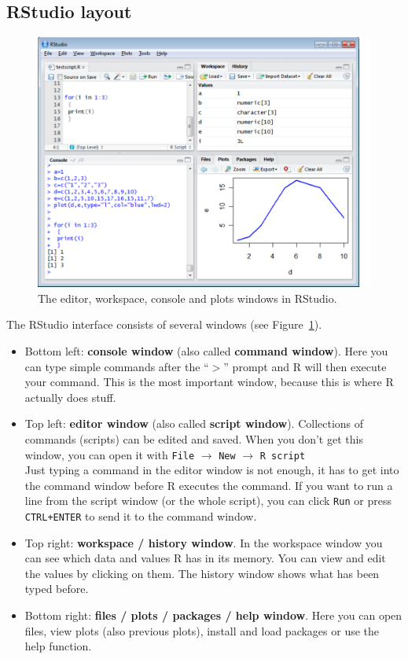 \documentclass[a4paper,11pt,twocolumn,tablecaptionabove]{scrartcl}
\begin{document}
\subsection{RStudio layout}

\begin{figure}[htb]
  \centering
  \includegraphics[width=13cm, clip=true, trim=0cm 0cm 9mm 0cm]{img/rstudio_screenshot.pdf}
  \caption{The editor, workspace, console and plots windows in RStudio.}
  \label{fig:screenshot}
\end{figure}

The RStudio interface consists of several windows (see Figure~\ref{fig:screenshot}). 
\begin{itemize}
\item Bottom left: \textbf{console window} (also called \textbf{command window}). Here you can type simple commands after the ``$>$'' prompt and R will then execute your command. This is the most important window, because this is where R actually does stuff. 
\item Top left: \textbf{editor window} (also called \textbf{script window}). Collections of commands (scripts) can be edited and saved. When you don't get this window, you can open it with \texttt{File} $\rightarrow$ \texttt{New} $\rightarrow$ \texttt{R script}\\
Just typing a command in the editor window is not enough, it has to get into the command window before R executes the command. If you want to run a line from the script window (or the whole script), you can click \texttt{Run} or press \texttt{CTRL+ENTER} to send it to the command window. 
\item Top right: \textbf{workspace / history window}. In the workspace window you can see which data and values R has in its memory. You can view and edit the values by clicking on them.
The history window shows what has been typed before. 
\item Bottom right: \textbf{files / plots / packages / help window}. Here you can open files, view plots (also previous plots), install and load packages or use the help function.
\end{itemize}
\end{document}
